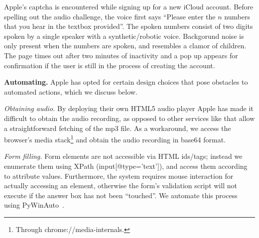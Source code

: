 Apple's captcha is encountered while signing up for a new iCloud account.
Before spelling out the audio challenge,
the voice first says ``Please enter the $n$ numbers that you hear in the textbox provided''. The 
spoken numbers consist of two digits spoken by a single speaker with a synthetic/robotic voice.
Backgorund noise is only present when the numbers are spoken,
and resembles a clamor of children.
The page times out after two minutes of inactivity and a pop up appears for confirmation if the user is 
still in the process of creating the account. 


\textbf{Automating.} Apple has opted for certain design choices that pose obstacles to automated actions,
which we discuss below.

\emph{Obtaining audio.} By deploying their own HTML5 audio player Apple has made it 
difficult to obtain the audio recording, as opposed to other services like \re
that allow a straightforward fetching of the mp3 file. As a workaround, we access 
the browser's media stack\footnote{Through chrome://media-internals.} and obtain the 
audio recording in base64 format.

\emph{Form filling.} Form elements are not accessible via HTML ids/tags; instead we enumerate them 
using XPath (input[@type='text']), and access them according to attribute values.
Furthermore, the system requires mouse interaction for actually accessing an element, otherwise the 
form's validation script will not execute if the answer box has not been ``touched''. We automate this 
process using PyWinAuto~\cite{pywinauto}.

